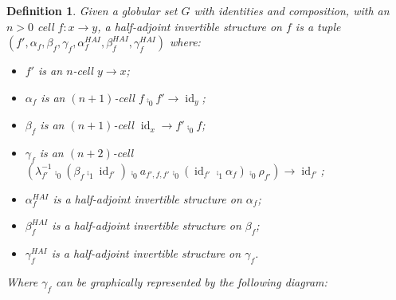 \documentclass[draft]{article}
\newtheorem{definition}[theorem]{Definition} \theoremstyle{remark}
\DeclareMathOperator{\id}{id}
\begin{document}
\begin{definition}
  Given a globular set \(G\) with identities and composition, with an
  \(n > 0\) cell \(f : x \to y\), a \emph{half-adjoint invertible}
  structure on \(f\) is a
  tuple \((f', \alpha_f, \beta_f, \gamma_f, \alpha_f^{HAI},
  \beta_f^{HAI}, \gamma_f^{HAI})\) where:
  \begin{itemize}
  \item \(f'\) is an \(n\)-cell \(y \to x\);
  \item \(\alpha_f\) is an \((n+1)\)-cell \(f \comp_0 f' \to \id_y\);
  \item \(\beta_f\) is an \((n+1)\)-cell \(\id_x \to f' \comp_0 f\);
  \item \(\gamma_f\) is an \((n+2)\)-cell \((\lambda_{f'}^{-1} \comp_0
    (\beta_f \comp_1 \id_{f'}) \comp_0 a_{f',f,f'} \comp_0 (\id_{f'}
    \comp_1 \alpha_f) \comp_0 \rho_{f'}) \to \id_{f'}\);
  \item \(\alpha_f^{HAI}\) is a half-adjoint invertible structure on
    \(\alpha_f\);
  \item \(\beta_f^{HAI}\) is a half-adjoint invertible structure on
    \(\beta_f\);
  \item \(\gamma_f^{HAI}\) is a half-adjoint invertible structure on
    \(\gamma_f\).
  \end{itemize}

  Where \(\gamma_f\) can be graphically represented by the following
  diagram:
  \begin{center}
  \end{center}


\end{definition}
\end{document}
